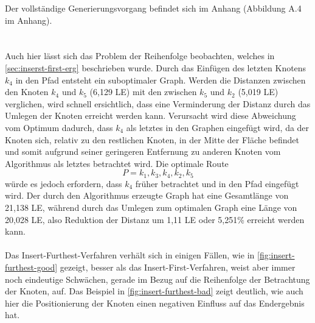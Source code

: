 Der vollständige Generierungsvorgang befindet sich im Anhang (Abbildung A.4 im Anhang). \\
\\\\
Auch hier lässt sich das Problem der Reihenfolge beobachten, welches in \vref{sec:inserst-first-erg} beschrieben wurde.
Durch das Einfügen des letzten Knotens $k_4$ in den Pfad entsteht ein suboptimaler Graph.
Werden die Distanzen zwischen den Knoten $k_4$ und $k_5$ (6,129 \ac{LE}) mit den zwischen $k_5$ und $k_2$ (5,019 \ac{LE}) verglichen, wird schnell ersichtlich, dass eine Verminderung der Distanz durch das Umlegen der Knoten erreicht werden kann.
Verursacht wird diese Abweichung vom Optimum dadurch, dass $k_4$ als letztes in den Graphen eingefügt wird, da der Knoten sich, relativ zu den restlichen Knoten, in der Mitte der Fläche befindet und somit aufgrund seiner geringeren Entfernung zu anderen Knoten vom Algorithmus als letztes betrachtet wird.
Die optimale Route
$$P = k_1, k_3, k_4, k_2, k_5$$ 
 würde es jedoch erfordern, dass $k_4$ früher betrachtet und in den Pfad eingefügt wird.
Der durch den Algorithmus erzeugte Graph hat eine Gesamtlänge von 21,138 \ac{LE}, während durch das Umlegen zum optimalen Graph eine Länge von 20,028 \ac{LE}, also Reduktion der Distanz um 1,11 \ac{LE} oder 5,251\% erreicht werden kann.
\\\\
Das Insert-Furthest-Verfahren verhält sich in einigen Fällen, wie in \vref{fig:insert-furthest-good} gezeigt, besser als das Insert-First-Verfahren, weist aber immer noch eindeutige Schwächen, gerade im Bezug auf die Reihenfolge der Betrachtung der Knoten, auf.
Das Beispiel in \vref{fig:insert-furthest-bad} zeigt deutlich, wie auch hier die Positionierung der Knoten einen negativen Einfluss auf das Endergebnis hat.